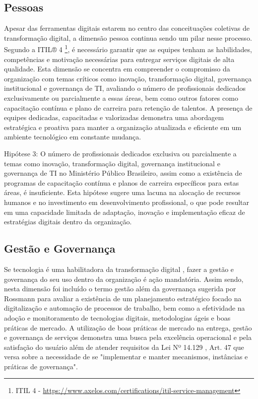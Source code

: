 \subsection{Pessoas}

Apesar das ferramentas digitais estarem no centro das conceituações coletivas de transformação digital, a dimensão pessoa continua sendo um pilar nesse processo. Segundo a ITIL® 4 \footnote{ITIL 4 - \url{https://www.axelos.com/certifications/itil-service-management}}, é necessário garantir que as equipes tenham as habilidades, competências e motivação necessárias para entregar serviços digitais de alta qualidade. Esta dimensão se concentra em compreender o compromisso da organização com temas críticos como inovação, transformação digital, governança institucional e governança de TI, avaliando o número de profissionais dedicados exclusivamente ou parcialmente a essas áreas, bem como outros fatores como capacitação contínua e plano de carreira para retenção de talentos. A presença de equipes dedicadas, capacitadas e valorizadas demonstra uma abordagem estratégica e proativa para manter a organização atualizada e eficiente em um ambiente tecnológico em constante mudança.

Hipótese 3: O número de profissionais dedicados exclusiva ou parcialmente a temas como inovação, transformação digital, governança institucional e governança de TI no Ministério Público Brasileiro, assim como a existência de programas de capacitação contínua e planos de carreira específicos para estas áreas, é insuficiente. Esta hipótese sugere uma lacuna na alocação de recursos humanos e no investimento em desenvolvimento profissional, o que pode resultar em uma capacidade limitada de adaptação, inovação e implementação eficaz de estratégias digitais dentro da organização.

 \subsection{Gestão e Governança}

 Se tecnologia é uma habilitadora da transformação digital \cite{transformacaoDigitalKraus2021}, fazer a gestão e governança do seu uso dentro da organização é ação mandatória. Assim sendo, nesta dimensão foi incluído o termo gestão além da governança sugerida por Rossmann \cite{rossmann2018digital} para avaliar a existência de um planejamento estratégico focado na digitalização e automação de processos de trabalho, bem como a efetividade na adoção e monitoramento de tecnologias digitais, metodologias ágeis e boas práticas de mercado. A utilização de boas práticas de mercado na entrega, gestão e governança de serviços demonstra uma busca pela excelência operacional e pela satisfação do usuário além de atender requisitos da Lei Nº 14.129 , Art. 47 que versa sobre a necessidade de se "implementar e manter mecanismos, instâncias e práticas de governança".

